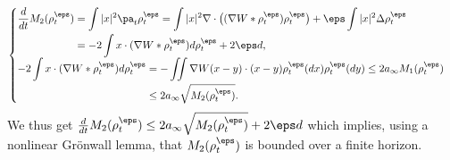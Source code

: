 \[
\begin{cases}
\begin{aligned}
\frac{d}{dt} M_2(\rho_t^\eps) &= \int |x|^2 \pa_t \rho_t^\eps = \int |x|^2 \nabla \cdot \big( (\nabla W * \rho_t^\eps) \rho_t^\eps \big) + \eps \int |x|^2 \Delta \rho_t^\eps \\
&= - 2 \int x \cdot (\nabla W * \rho_t^\eps) d\rho_t^\eps + 2\eps d,
\end{aligned}
\\
\begin{aligned}
- 2 \int x \cdot (\nabla W * \rho_t^\eps) d\rho_t^\eps &= - \iint \nabla W(x-y) \cdot (x-y) \rho_t^\eps(dx) \rho_t^\eps(dy) \leq 2 a_\infty M_1(\rho_t^\eps) \\
&\leq 2 a_\infty \sqrt{M_2(\rho_t^\eps)}.
\end{aligned}
\end{cases}
\]
We thus get $\frac{d}{dt} M_2(\rho_t^\eps) \leq 2 a_\infty \sqrt{M_2(\rho_t^\eps)} + 2\eps d$ which implies, using a nonlinear Grönwall lemma, that $M_2(\rho_t^\eps)$ is bounded over a finite horizon.

